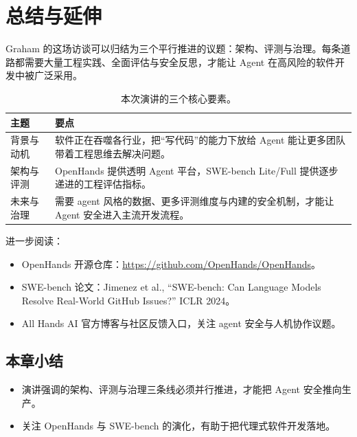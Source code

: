 \documentclass[a4paper]{article}
\begin{document}
\section{总结与延伸}
Graham 的这场访谈可以归结为三个平行推进的议题：架构、评测与治理。每条道路都需要大量工程实践、全面评估与安全反思，才能让 Agent 在高风险的软件开发中被广泛采用。

\begin{table}[H]
\centering
\begin{tabular}{p{} p{}}
\toprule
主题 & 要点 \\
\midrule
背景与动机 & 软件正在吞噬各行业，把“写代码”的能力下放给 Agent 能让更多团队带着工程思维去解决问题。 \\
\midrule
架构与评测 & OpenHands 提供透明 Agent 平台，SWE-bench Lite/Full 提供逐步递进的工程评估指标。 \\
\midrule
未来与治理 & 需要 agent 风格的数据、更多评测维度与内建的安全机制，才能让 Agent 安全进入主流开发流程。 \\
\bottomrule
\end{tabular}
\caption{本次演讲的三个核心要素。}
\end{table}

进一步阅读：
\begin{itemize}
    \item OpenHands 开源仓库：\href{https://github.com/OpenHands/OpenHands}{https://github.com/OpenHands/OpenHands}。
    \item SWE-bench 论文：Jimenez et al., ``SWE-bench: Can Language Models Resolve Real-World GitHub Issues?'' ICLR 2024。
    \item All Hands AI 官方博客与社区反馈入口，关注 agent 安全与人机协作议题。
\end{itemize}

\subsection{本章小结}
\begin{itemize}
    \item 演讲强调的架构、评测与治理三条线必须并行推进，才能把 Agent 安全推向生产。
    \item 关注 OpenHands 与 SWE-bench 的演化，有助于把代理式软件开发落地。
\end{itemize}
\end{document}
